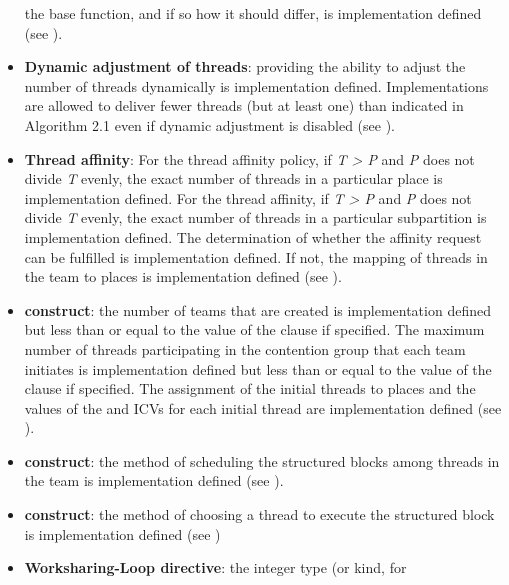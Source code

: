 \begin{itemize}
      the base function, and if so how it should differ, is implementation defined
      (see ).
\item \textbf{Dynamic adjustment of threads}: providing the ability to 
      adjust the number of threads dynamically is implementation defined. 
      Implementations are allowed to deliver fewer threads (but at least one) 
      than indicated in Algorithm 2.1 even if dynamic adjustment is disabled (see 
      ).
\item \textbf{Thread affinity}: For the  thread affinity policy, 
      if \emph{T > P} and \emph{P} does not divide \emph{T} evenly, the exact
      number of threads in a particular place is implementation defined.
      For the  thread affinity, if \emph{T > P} and \emph{P} does not
      divide \emph{T} evenly, the exact number of threads in a particular
      subpartition is implementation defined.  The determination of
      whether the affinity request can be fulfilled is implementation
      defined.  If not, the mapping of threads in the team 
      to places is implementation defined (see
      ).
\item {} \textbf{construct}: the number of teams that are created 
      is implementation defined but less than or equal to the value of the 
       clause if specified. The maximum number of threads 
      participating in the contention group that each team initiates is
      implementation defined but less than or equal to the value of the 
       clause if specified.  The assignment of the 
      initial threads to places and the values of the  
      and  ICVs for each initial thread are
      implementation defined (see ).
\item {} \textbf{construct}: the method of scheduling the 
      structured blocks among threads in the team is implementation defined 
      (see ).
\item {} \textbf{construct}: the method of choosing a thread to 
      execute the structured block is implementation defined (see 
      )
\item \textbf{Worksharing-Loop directive}: the integer type (or kind, for 

\end{itemize}
